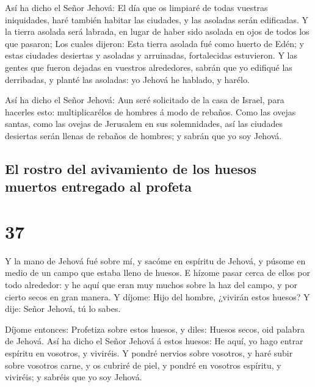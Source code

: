  Así ha dicho el Señor Jehová: El día que os limpiaré de
todas vuestras iniquidades, haré también habitar las ciudades, y las
asoladas serán edificadas.  Y la tierra asolada será
labrada, en lugar de haber sido asolada en ojos de todos los que
pasaron;  Los cuales dijeron: Esta tierra asolada fué
como huerto de Edén; y estas ciudades desiertas y asoladas y arruinadas,
fortalecidas estuvieron.  Y las gentes que fueron dejadas
en vuestros alrededores, sabrán que yo edifiqué las derribadas, y planté
las asoladas: yo Jehová he hablado, y harélo.

 Así ha dicho el Señor Jehová: Aun seré solicitado de la
casa de Israel, para hacerles esto: multiplicarélos de hombres á modo de
rebaños.  Como las ovejas santas, como las ovejas de
Jerusalem en sus solemnidades, así las ciudades desiertas serán llenas
de rebaños de hombres; y sabrán que yo soy Jehová.

\hypertarget{el-rostro-del-avivamiento-de-los-huesos-muertos-entregado-al-profeta}{%
\subsection{El rostro del avivamiento de los huesos muertos entregado al
profeta}\label{el-rostro-del-avivamiento-de-los-huesos-muertos-entregado-al-profeta}}

\hypertarget{section-36}{%
\section{37}\label{section-36}}

 Y la mano de Jehová fué sobre mí, y sacóme en espíritu de
Jehová, y púsome en medio de un campo que estaba lleno de huesos.
 E hízome pasar cerca de ellos por todo alrededor: y he
aquí que eran muy muchos sobre la haz del campo, y por cierto secos en
gran manera.  Y díjome: Hijo del hombre, ¿vivirán estos
huesos? Y dije: Señor Jehová, tú lo sabes.

 Díjome entonces: Profetiza sobre estos huesos, y diles:
Huesos secos, oid palabra de Jehová.  Así ha dicho el
Señor Jehová á estos huesos: He aquí, yo hago entrar espíritu en
vosotros, y viviréis.  Y pondré nervios sobre vosotros, y
haré subir sobre vosotros carne, y os cubriré de piel, y pondré en
vosotros espíritu, y viviréis; y sabréis que yo soy Jehová.

